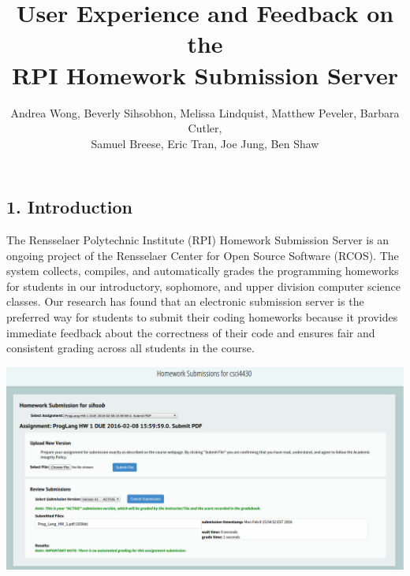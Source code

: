 \documentclass[thesis]{hmcposter}
\title{User Experience and Feedback on the\\
\vspace{-0.1in}
RPI Homework Submission Server}
\author{Andrea Wong, Beverly Sihsobhon, Melissa Lindquist, Matthew Peveler, Barbara Cutler, \\
\vspace{-0.7in}
Samuel Breese, Eric Tran, Joe Jung, Ben Shaw}
\begin{document}
\begin{poster}

\section{1. Introduction}

The Rensselaer Polytechnic Institute (RPI) Homework Submission Server
is an ongoing project of the Rensselaer Center for Open Source
Software (RCOS). The system collects, compiles, and automatically
grades the programming homeworks for students in our introductory,
sophomore, and upper division computer science classes.  Our research
has found that an electronic submission server is the preferred way
for students to submit their coding homeworks because it provides
immediate feedback about the correctness of their code and ensures
fair and consistent grading across all students in the course.

\begin{center}
\includegraphics[width=12in]{HSS_prog_lang}
\end{center}


\end{poster}
\end{document}
